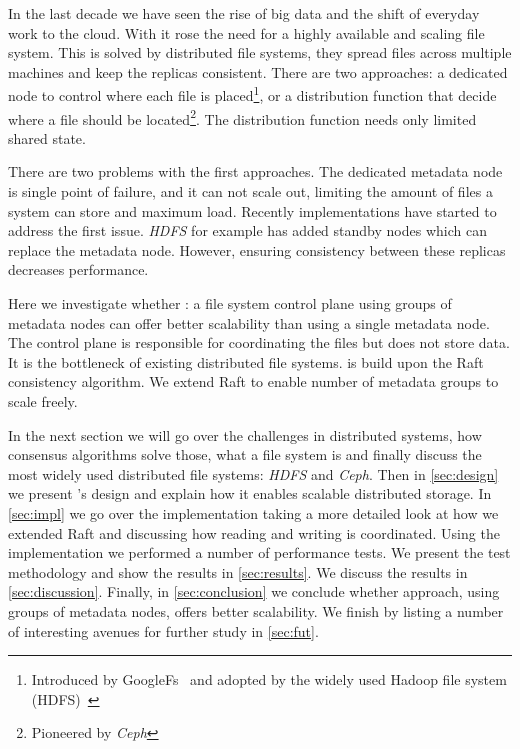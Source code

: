 In the last decade we have seen the rise of big data and the shift of everyday work to the cloud. With it rose the need for a highly available and scaling file system. This is solved by distributed file systems, they spread files across multiple machines and keep the replicas consistent. There are two approaches: a dedicated node to control where each file is placed\footnote{Introduced by GoogleFs~\cite{GFS,GFS_interview} and adopted by the widely used Hadoop file system (HDFS)~\cite{hdfs}}, or a distribution function that decide where a file should be located\footnote{Pioneered by \textit{Ceph}\cite{ceph}}. The distribution function needs only limited shared state.

There are two problems with the first approaches. The dedicated metadata node is single point of failure, and it can not scale out, limiting the amount of files a system can store and maximum load. Recently implementations have started to address the first issue. \textit{HDFS} for example has added standby nodes \cite{hdfs_ha_nfs, hdfs_ha_q} which can replace the metadata node. However, ensuring consistency between these replicas decreases performance. 


Here we investigate whether \name{}: a file system control plane using groups of metadata nodes can offer better scalability than using a single metadata node. The control plane is responsible for coordinating the files but does not store data. It is the bottleneck of existing distributed file systems. \Name{} is build upon the Raft\cite{raft} consistency algorithm. We extend Raft to enable number of metadata groups to scale freely. 

In the next section we will go over the challenges in distributed systems, how consensus algorithms solve those, what a file system is and finally discuss the most widely used distributed file systems: \textit{HDFS} and \textit{Ceph}. 
%
Then in \cref{sec:design} we present \name{}'s design and explain how it enables scalable distributed storage.
%
In \cref{sec:impl} we go over the implementation taking a more detailed look at how we extended Raft and discussing how reading and writing is coordinated.
%
Using the \name{} implementation we performed a number of performance tests. We present the test methodology and show the results in \cref{sec:results}.
% 
We discuss the results in \cref{sec:discussion}.
%
Finally, in \cref{sec:conclusion} we conclude whether \name{} approach, using groups of metadata nodes, offers better scalability. 
%
We finish by listing a number of interesting avenues for further study in \cref{sec:fut}.
